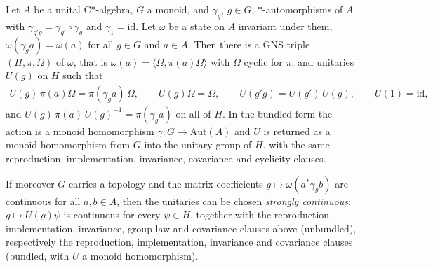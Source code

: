 \begin{theorem}
    \label{thrm:invariant-state-gns-unitary-general}
    \leanok
    Let $A$ be a unital C*-algebra, $G$ a monoid, and $\gamma_g$, $g \in G$, $*$-automorphisms of $A$ with $\gamma_{g'g} = \gamma_{g'} \circ \gamma_g$ and $\gamma_1 = \mathrm{id}$. Let $\omega$ be a state on $A$ invariant under them, $\omega(\gamma_g a) = \omega(a)$ for all $g \in G$ and $a \in A$. Then there is a GNS triple $(H, \pi, \Omega)$ of $\omega$, that is $\omega(a) = \langle \Omega, \pi(a)\Omega\rangle$ with $\Omega$ cyclic for $\pi$, and unitaries $U(g)$ on $H$ such that
    \begin{align}
        U(g)\,\pi(a)\Omega = \pi(\gamma_g a)\,\Omega, \qquad U(g)\Omega = \Omega, \qquad U(g'g) = U(g')\,U(g), \qquad U(1) = \mathrm{id},
    \end{align}
    and $U(g)\,\pi(a)\,U(g)^{-1} = \pi(\gamma_g a)$ on all of $H$. In the bundled form the action is a monoid homomorphism $\gamma : G \to \mathrm{Aut}(A)$ and $U$ is returned as a monoid homomorphism from $G$ into the unitary group of $H$, with the same reproduction, implementation, invariance, covariance and cyclicity clauses.

    If moreover $G$ carries a topology and the matrix coefficients $g \mapsto \omega(a^* \gamma_g b)$ are continuous for all $a, b \in A$, then the unitaries can be chosen \emph{strongly continuous}: $g \mapsto U(g)\psi$ is continuous for every $\psi \in H$, together with the reproduction, implementation, invariance, group-law and covariance clauses above (unbundled), respectively the reproduction, implementation, invariance and covariance clauses (bundled, with $U$ a monoid homomorphism).
\end{theorem}
